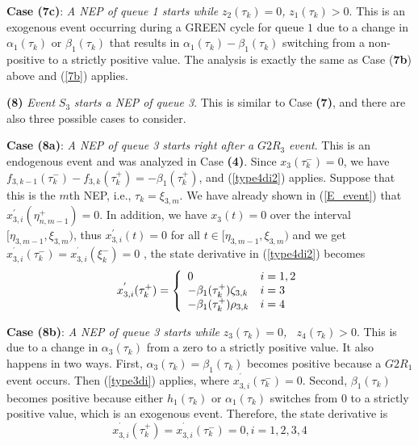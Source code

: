 \documentclass{ifacconf}\usepackage{graphicx}
\begin{document}
\textbf{Case (7c)}: \emph{A NEP of queue 1 starts while }$z_{2}(\tau_{k})=0$\emph{,  }$z_{1}(\tau_{k})>0$. This is an exogenous event occurring during
a GREEN cycle for queue $1$ due to a change in $\alpha_{1}(\tau_{k})$ or
$\beta_{1}(\tau_{k})$ that results in $\alpha_{1}(\tau_{k})-\beta_{1}(\tau
_{k})$ switching from a non-positive to a strictly positive value. The
analysis is exactly the same as Case (\textbf{7b}) above and (\ref{7b}) applies.

\textbf{(8)} \emph{Event }$S_{3}$\emph{ starts a NEP of queue 3}. This is
similar to Case \textbf{(7)}, and there are also three possible cases to consider.

\textbf{Case (8a)}: \emph{A NEP of queue 3 starts right after a }$G2R_{3}$\emph{ event}. This is an endogenous event and was analyzed in Case
\textbf{(4)}. Since $x_{3}(\tau_{k}^{-})=0$, we have $f_{3,k-1}(\tau_{k}^{-})-f_{3,k}(\tau_{k}^{+})=-\beta_{1}(\tau_{k}^{+})$, and (\ref{type4di2})
applies. Suppose that this is the $m$th NEP, i.e., $\tau_{k}=\xi_{3,m}$. We
have already shown in (\ref{E_event}) that $x_{3,i}^{\prime}(\eta_{n,m-1}^{+})=0$. In addition, we have $x_{3}(t)=0$ over the interval $[\eta
_{3,m-1},\xi_{3,m})$, thus $x_{3,i}^{\prime}(t)=0$ for all $t\in\lbrack
\eta_{3,m-1},\xi_{3,m})$ and we get $x_{3,i}^{^{\prime}}(\tau_{k}^{-})=x_{3,i}^{^{\prime}}(\xi_{k}^{-})=0$ , the state derivative in
(\ref{type4di2}) becomes
\begin{equation}
x_{3,i}^{^{\prime}}(\tau_{k}^{+})=\left\{
\begin{array}
[c]{ll}0 & i=1,2\\
-\beta_{1}(\tau_{k}^{+})\zeta_{3,k} & i=3\\
-\beta_{1}(\tau_{k}^{+})\rho_{3,k} & i=4
\end{array}
\right.  \label{type8adi}\end{equation}


\textbf{Case (8b)}: \emph{ A NEP of queue 3 starts while }$z_{3}(\tau_{k})=0$\emph{, \ }$z_{4}(\tau_{k})>0$. This is due to a change in $\alpha
_{3}(\tau_{k})$ from a zero to a strictly positive value. It also happens in
two ways. First, $\alpha_{3}(\tau_{k})=\beta_{1}(\tau_{k})$ becomes positive
because a $G2R_{1}$ event occurs. Then (\ref{type3di}) applies, where
$x_{3,i}^{^{\prime}}(\tau_{k}^{-})=0$. Second, $\beta_{1}(\tau_{k})$ becomes
positive because either $h_{1}(\tau_{k})$ or $\alpha_{1}(\tau_{k})$ switches
from 0 to a strictly positive value, which is an exogenous event. Therefore,
the state derivative is
\begin{equation}
x_{3,i}^{^{\prime}}(\tau_{k}^{+})=x_{3,i}^{^{\prime}}(\tau_{k}^{-})=0,i=1,2,3,4\label{8b}\end{equation}
\end{document}

